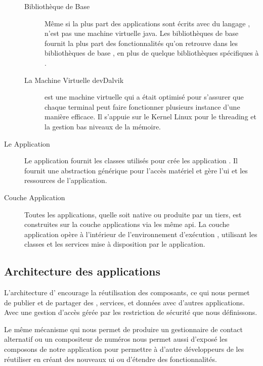 \begin{description}
\begin{description}
\item [Bibliothèque de Base]

Même si la plus part des applications \android{} sont écrits avec du langage
,  n'est pas une machine virtuelle java. Les bibliothèques
\android{} de base fournit la plus part des fonctionnalités qu'on retrouve
dans les bibliothèques de base , en plus de quelque bibliothèques
spécifiques à \android{}.

\item [La Machine Virtuelle dev{Dalvik}]

 est une machine virtuelle qui a était optimisé pour
s'assurer que chaque terminal peut faire fonctionner plusieurs instance
d'une manière efficace. Il s’appuie sur le Kernel Linux pour le
threading et la gestion bas niveaux de la mémoire.

\end{description}

\item [Le \en{Framework} Application]

Le  application fournit les classes utilisés pour crée les application \android{}. Il fournit une abstraction générique pour l’accès matériel et gère l'\gls{ui} et les ressources de l'application.

\item [Couche Application]

Toutes les applications, quelle soit native ou produite par un tiers, est
construites sur la couche applications via les même \gls{api}. La couche
application opère à l'intérieur de l'environnement d’exécution \android{},
utilisant les classes et les services mise à disposition par le 
application.

\end{description}

\subsection[Architecture des applications \android{}]{Architecture des applications \android{}\cite{pa4ad:chptr1}}

L'architecture d'\android{} encourage la réutilisation des composants,
ce qui nous permet de publier et de partager des ,
services, et données avec d'autres applications. Avec une gestion
d'accès gérée par les restriction de sécurité que nous définissons.

Le même mécanisme qui nous permet de produire un gestionnaire de contact alternatif ou un compositeur de numéros nous permet aussi d'exposé les composons de notre application pour permettre à d'autre développeurs de les réutiliser en créant des nouveaux \gls{ui} ou d’étendre des fonctionnalités.


